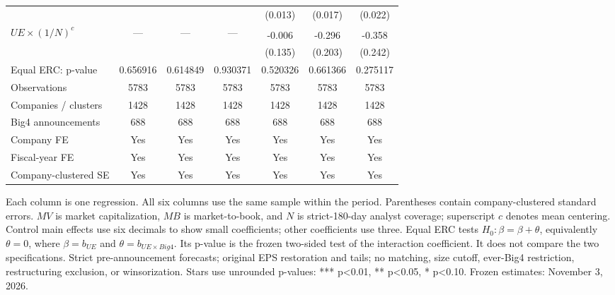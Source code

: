 \documentclass[10pt]{article}
\newcommand{\sym}[1]{\textsuperscript{#1}}
\begin{document}
\begin{tabular*}{\textwidth}{@{\extracolsep{\fill}}lcccccc@{}}
 &  &  &  & (0.013) & (0.017) & (0.022) \\
\(UE\times(1/N)^c\) & --- & --- & --- & -0.006\sym{} & -0.296\sym{} & -0.358\sym{} \\
 &  &  &  & (0.135) & (0.203) & (0.242) \\
\midrule
Equal ERC: p-value & 0.656916 & 0.614849 & 0.930371 & 0.520326 & 0.661366 & 0.275117 \\
Observations & 5783 & 5783 & 5783 & 5783 & 5783 & 5783 \\
Companies / clusters & 1428 & 1428 & 1428 & 1428 & 1428 & 1428 \\
Big4 announcements & 688 & 688 & 688 & 688 & 688 & 688 \\
Company FE & Yes & Yes & Yes & Yes & Yes & Yes \\
Fiscal-year FE & Yes & Yes & Yes & Yes & Yes & Yes \\
Company-clustered SE & Yes & Yes & Yes & Yes & Yes & Yes \\
\bottomrule\end{tabular*}\par\medskip
\noindent\footnotesize Each column is one regression. All six columns use the same sample within the period. Parentheses contain company-clustered standard errors. \(MV\) is market capitalization, \(MB\) is market-to-book, and \(N\) is strict-180-day analyst coverage; superscript \(c\) denotes mean centering. Control main effects use six decimals to show small coefficients; other coefficients use three. Equal ERC tests \(H_0:\beta=\beta+\theta\), equivalently \(\theta=0\), where \(\beta=b_{UE}\) and \(\theta=b_{UE\times Big4}\). Its p-value is the frozen two-sided test of the interaction coefficient. It does not compare the two specifications. Strict pre-announcement forecasts; original EPS restoration and tails; no matching, size cutoff, ever-Big4 restriction, restructuring exclusion, or winsorization. Stars use unrounded p-values: *** p<0.01, ** p<0.05, * p<0.10. Frozen estimates: November 3, 2026.
\end{document}
